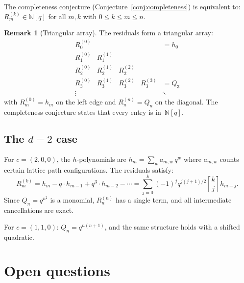 \documentclass[11pt]{article}
\newcommand{\N}{\mathbb{N}}
\newcommand{\qbin}[2]{\genfrac{[}{]}{0pt}{}{#1}{#2}}
\theoremstyle{plain}
\theoremstyle{definition}
\newtheorem{remark}[theorem]{Remark}
\begin{document}
The completeness conjecture (Conjecture~\ref{conj:completeness})
is equivalent to: $R_m^{(k)} \in \N[q]$ for all $m, k$ with
$0 \leq k \leq m \leq n$.

\begin{remark}[Triangular array]
\label{rem:triangle}
The residuals form a triangular array:
\[
  \begin{array}{ccccl}
    R_0^{(0)} & & & & = h_0 \\
    R_1^{(0)} & R_1^{(1)} & & & \\
    R_2^{(0)} & R_2^{(1)} & R_2^{(2)} & & \\
    R_3^{(0)} & R_3^{(1)} & R_3^{(2)} & R_3^{(3)} &
      = Q_3 \\
    \vdots & & & & \ddots
  \end{array}
\]
with $R_m^{(0)} = h_m$ on the left edge and
$R_n^{(n)} = Q_n$ on the diagonal.  The completeness
conjecture states that every entry is in~$\N[q]$.
\end{remark}


\subsection{The $d = 2$ case}

For $c = (2,0,0)$, the $h$-polynomials are
$h_m = \sum_{w} a_{m,w}\, q^w$ where $a_{m,w}$ counts
certain lattice path configurations.  The residuals
satisfy:
\[
  R_m^{(k)} = h_m - q \cdot h_{m-1} + q^3 \cdot h_{m-2}
    - \cdots
  = \sum_{j=0}^{k} (-1)^j q^{j(j+1)/2} \qbin{k}{j}
    h_{m-j}.
\]
Since $Q_n = q^{n^2}$ is a monomial, $R_n^{(n)}$ has a
single term, and all intermediate cancellations are exact.

For $c = (1,1,0)$: $Q_n = q^{n(n+1)}$, and the same
structure holds with a shifted quadratic.


\section{Open questions}
\label{sec:open}
\end{document}
